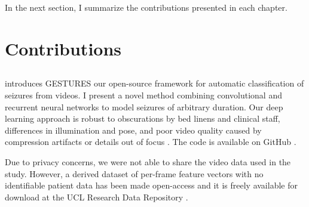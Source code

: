 In the next section, I summarize the contributions presented in each chapter.

\section{Contributions}

\subsection{}

 introduces \ac{GESTURES} our open-source framework for automatic classification of seizures from videos.
I present a novel method combining convolutional and recurrent neural networks to model seizures of arbitrary duration.
Our deep learning approach is robust to obscurations by bed linens and clinical staff, differences in illumination and pose, and poor video quality caused by compression artifacts or details out of focus \cite{perez-garcia_transfer_2021}.
The code is available on GitHub%
.

Due to privacy concerns, we were not able to share the video data used in the study.
However, a derived dataset of per-frame feature vectors with no identifiable patient data has been made open-access and it is freely available for download at the UCL Research Data Repository \cite{perez-garcia_data_2021}.



\subsection{}

